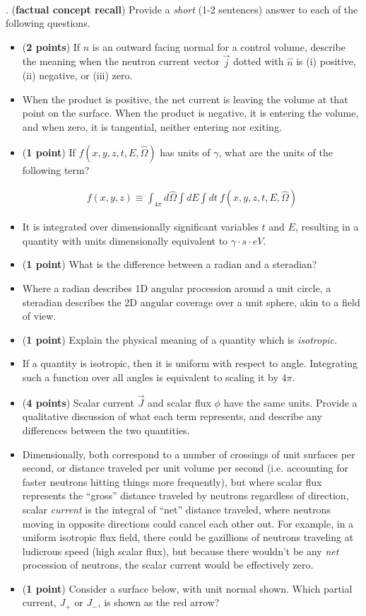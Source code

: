 \documentclass[11pt]{article}
\newcommand{\beq}{\begin{equation}\begin{aligned}}
\newcommand{\eeq}{\end{aligned}\end{equation}}
\newcommand{\ans}[1]{{\color{violet}#1}}
\begin{document}
\\

. ({\bf factual concept recall}) Provide a {\it short} (1-2 sentences) answer to each of the following questions.

\begin{itemize}
\item[(a)] ({\bf 2 points}) If $\hat{n}$ is an outward facing normal for a control volume, describe the meaning when the neutron current vector $\vec{j}$ dotted with $\hat{n}$ is (i) positive, (ii) negative, or (iii) zero.
\item[] \ans{When the product is positive, the net current is leaving the volume at that point on the surface. When the product is negative, it is entering the volume, and when zero, it is tangential, neither entering nor exiting.}
\item[(b)] ({\bf 1 point}) If $f(x,y,z,t,E,\hat{\Omega})$ has units of $\gamma$, what are the units of the following term?

\beq
f(x,y,z)\equiv\int_{4\pi}d\hat{\Omega}\int dE\int dt\ f(x,y,z,t,E,\hat{\Omega})
\eeq
\item[] \ans{It is integrated over dimensionally significant variables $t$ and $E$, resulting in a quantity with units dimensionally equivalent to $\gamma\cdot s\cdot eV$.}
\item[(c)] ({\bf 1 point}) What is the difference between a radian and a steradian?
\item[] \ans{Where a radian describes 1D angular procession around a unit circle, a steradian describes the 2D angular coverage over a unit sphere, akin to a field of view.}
\item[(d)] ({\bf 1 point}) Explain the physical meaning of a quantity which is {\it isotropic}.
\item[] \ans{If a quantity is isotropic, then it is uniform with respect to angle. Integrating such a function over all angles is equivalent to scaling it by $4\pi$.}
\item[(e)] ({\bf 4 points}) Scalar current $\vec{J}$ and scalar flux $\phi$ have the same units. Provide a qualitative discussion of what each term represents, and describe any differences between the two quantities.
\item[] \ans{Dimensionally, both correspond to a number of crossings of unit surfaces per second, or distance traveled per unit volume per second (i.e. accounting for faster neutrons hitting things more frequently), but where scalar flux represents the ``gross'' distance traveled by neutrons regardless of direction, scalar \emph{current} is the integral of ``net'' distance traveled, where neutrons moving in opposite directions could cancel each other out. For example, in a uniform isotropic flux field, there could be gazillions of neutrons traveling at ludicrous speed (high scalar flux), but because there wouldn't be any \emph{net} procession of neutrons, the scalar current would be effectively zero.}
\item[(f)] ({\bf 1 point}) Consider a surface below, with unit normal shown. Which partial current, $J_+$ or $J_-$, is shown as the red arrow?


\end{itemize}
\end{document}
